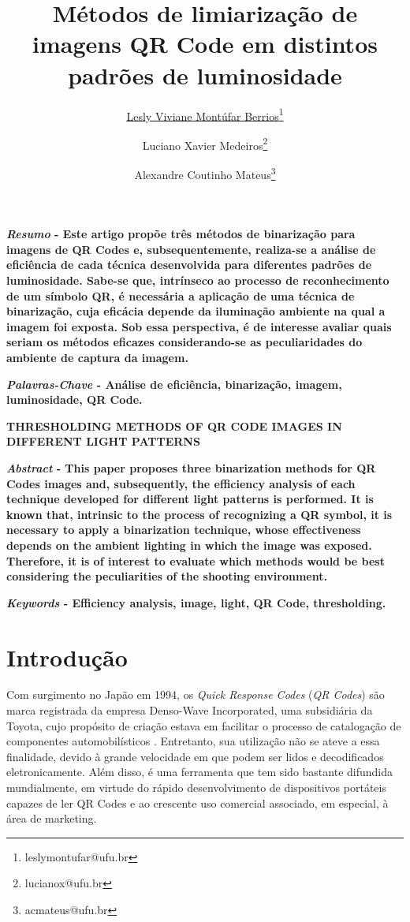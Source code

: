 \documentclass{ceel}
\title{Métodos de limiarização de imagens QR Code em distintos padrões de luminosidade}
\author[1]{\underline{Lesly Viviane Montúfar Berrios}\thanks{leslymontufar@ufu.br}}
\author[2]{Luciano Xavier Medeiros\thanks{lucianox@ufu.br}}
\author[2]{Alexandre Coutinho Mateus\thanks{acmateus@ufu.br}}
\affil[1]{FEELT - Universidade Federal de Uberlândia}
\affil[2]{FEELT - Professor Adjunto - Universidade Federal de Uberlândia}
\begin{document}
\inserirtitulo

\begin{multicols}{2}

\textbf{\emph{Resumo} - Este artigo propõe três métodos de binarização para imagens de QR Codes e, subsequentemente, realiza-se a análise de eficiência de cada técnica desenvolvida para diferentes padrões de luminosidade. Sabe-se que, intrínseco ao processo de reconhecimento de um símbolo QR, é necessária a aplicação de uma técnica de binarização, cuja eficácia depende da iluminação ambiente na qual a imagem foi exposta. Sob essa perspectiva, é de interesse avaliar quais seriam os métodos eficazes considerando-se as peculiaridades do ambiente de captura da imagem.}
\vspace*{10pt}

\textbf{\emph{Palavras-Chave} - Análise de eficiência, binarização, imagem, luminosidade, QR Code.}


\begin{center}
\noindent\textbf{\large \uppercase{Thresholding methods of QR Code images in different light patterns}}
\end{center}

\textbf{\emph{Abstract} - This paper proposes three binarization methods for QR Codes images and, subsequently, the efficiency analysis of each technique developed for different light patterns is performed. It is known that, intrinsic to the process of recognizing a QR symbol, it is necessary to apply a binarization technique, whose effectiveness depends on the ambient lighting in which the image was exposed. Therefore, it is of interest to evaluate which methods would be best considering the peculiarities of the shooting environment.} 
\vspace*{10pt}

\textbf{\emph{Keywords} - Efficiency analysis, image, light, QR Code, thresholding.}

\section{Introdução}
Com surgimento no Japão em 1994, os \textit{Quick Response Codes} (\textit{QR Codes}) são marca registrada da empresa Denso-Wave Incorporated, uma subsidiária da Toyota, cujo propósito de criação estava em facilitar o processo de catalogação de componentes automobilísticos \cite{denso}. Entretanto, sua utilização não se ateve a essa finalidade, devido à grande velocidade em que podem ser lidos e decodificados eletronicamente. Além disso, é uma ferramenta que tem sido bastante difundida mundialmente, em virtude do rápido desenvolvimento de dispositivos portáteis capazes de ler QR Codes e ao crescente uso comercial associado, em especial, à área de marketing.


\end{multicols}
\end{document}
